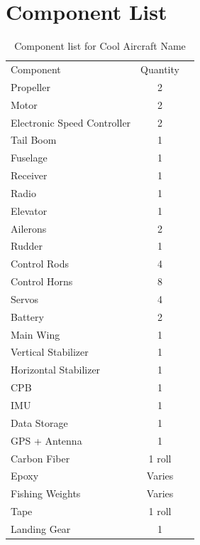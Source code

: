 \documentclass[footheight=20pt, footsepline, headheight=20pt, headsepline]{scrartcl}
\begin{document}
\section{Component List}
\begin{table}[h!]
\begin{center}
\caption{Component list for Cool Aircraft Name}
\label{tab:table1}
\begin{tabular}{l|c|r} %
Component & Quantity \\
Propeller & 2 \\
Motor & 2 \\
Electronic Speed Controller & 2 \\
Tail Boom & 1 \\
Fuselage & 1 \\
Receiver & 1 \\
Radio & 1 \\
Elevator & 1 \\
Ailerons & 2 \\
Rudder & 1 \\
Control Rods & 4 \\
Control Horns & 8 \\
Servos & 4 \\
Battery & 2 \\
Main Wing & 1 \\
Vertical Stabilizer & 1 \\
Horizontal Stabilizer & 1 \\
CPB & 1 \\
IMU & 1 \\
Data Storage & 1 \\
GPS + Antenna & 1 \\
Carbon Fiber & 1 roll \\
Epoxy & Varies \\
Fishing Weights & Varies \\
Tape & 1 roll \\
Landing Gear & 1\\
\end{tabular}
\end{center}
\end{table}
\end{document}
